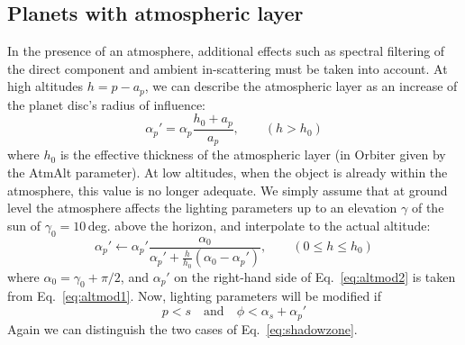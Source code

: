 \documentclass[a4paper]{article}
\begin{document}
\subsection{Planets with atmospheric layer}
In the presence of an atmosphere, additional effects such as spectral filtering of the direct component and ambient in-scattering must be taken into account.
At high altitudes $h=p-a_p$, we can describe the atmospheric layer as an increase of the planet disc's radius of influence:
\begin{equation}\label{eq:altmod1}
\alpha_p' = \alpha_p \frac{h_0 + a_p}{a_p},\qquad (h > h_0)
\end{equation}
where $h_0$ is the effective thickness of the atmospheric layer (in Orbiter given by the AtmAlt parameter).
At low altitudes, when the object is already within the atmosphere, this value is no longer adequate. We simply assume that at ground level the atmosphere affects the lighting parameters up to an elevation $\gamma$ of the sun of $\gamma_0=10$\,deg. above the horizon, and interpolate to the actual altitude:
\begin{equation}\label{eq:altmod2}
\alpha_p' \leftarrow \alpha_p' \frac{\alpha_0}{\alpha_p'+\frac{h}{h_0}(\alpha_0-\alpha_p')},\qquad (0 \leq h \leq h_0)
\end{equation}
where $\alpha_0 = \gamma_0+\pi/2$, and $\alpha_p'$ on the right-hand side of Eq.~\ref{eq:altmod2} is taken from Eq.~\ref{eq:altmod1}.
Now, lighting parameters will be modified if
\begin{equation}
p < s \quad\text{and}\quad \phi < \alpha_s + \alpha_p'
\end{equation}
Again we can distinguish the two cases of Eq.~\ref{eq:shadowzone}.
\end{document}
